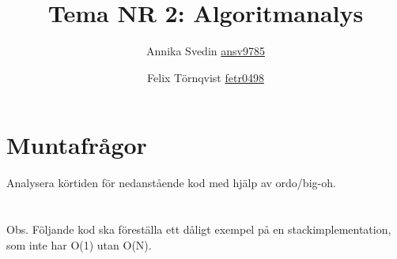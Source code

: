 \documentclass[a5paper,10pt,oneside]{article}
\title{Tema NR 2: Algoritmanalys}
\author{Annika Svedin \url{ansv9785} \and Felix Törnqvist \url{fetr0498}}
\begin{document}
\maketitle

\section*{Muntafrågor}

Analysera körtiden för nedanstående kod med hjälp av ordo/big-oh.

\section{}




\section{}



\section{}
Obs. Följande kod ska föreställa ett dåligt exempel på en stackimplementation, som inte har O(1) utan O(N).



\section{}

\end{document}
